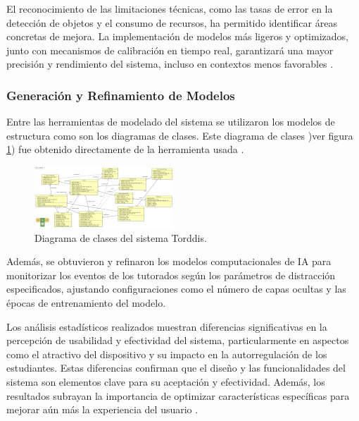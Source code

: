 \documentclass[a4paper,fleqn]{cas-sc}
\begin{document}
				El reconocimiento de las limitaciones técnicas, como las tasas de error en la detección de objetos y el consumo de recursos, ha permitido identificar áreas concretas de mejora. La implementación de modelos más ligeros y optimizados, junto con mecanismos de calibración en tiempo real, garantizará una mayor precisión y rendimiento del sistema, incluso en contextos menos favorables \citep{Falzetti2024Promoting}.
				
			\subsubsection{Generación y Refinamiento de Modelos}
				Entre las herramientas de modelado del sistema  se utilizaron los modelos de estructura como son los diagramas de clases. Este diagrama de clases )ver figura \ref{fig:ClassDiagram}) fue obtenido directamente de la herramienta usada \citep{Guerrero2024Test}.
				
				\begin{figure}[hbt!]
					\centering
					\includegraphics[frame,scale=0.5, width=\linewidth]{figs/Figure_8}
					\caption{Diagrama de clases del sistema Torddis.\label{fig:ClassDiagram}}
				\end{figure} 
				
				Además, se obtuvieron y refinaron los modelos computacionales de IA para monitorizar los eventos de los tutorados según los parámetros de distracción especificados, ajustando configuraciones como el número de capas ocultas y las épocas de entrenamiento del modelo.
				
				Los análisis estadísticos realizados muestran diferencias significativas en la percepción de usabilidad y efectividad del sistema, particularmente en aspectos como el atractivo del dispositivo y su impacto en la autorregulación de los estudiantes. Estas diferencias confirman que el diseño y las funcionalidades del sistema son elementos clave para su aceptación y efectividad. Además, los resultados subrayan la importancia de optimizar características específicas para mejorar aún más la experiencia del usuario \citep{Deng2024Does,Conati2021Toward}.
				
\end{document}
